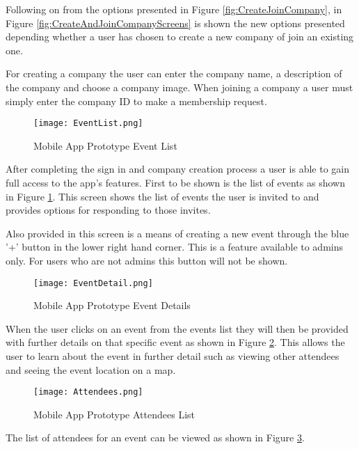 Following on from the options presented in Figure \ref{fig:CreateJoinCompany}, in Figure \ref{fig:CreateAndJoinCompanyScreens} is shown the new options presented depending whether a user has chosen to create a new company of join an existing one. 

For creating a company the user can enter the company name, a description of the company and choose a company image. When joining a company a user must simply enter the company ID to make a membership request.

\clearpage
\begin{figure}[ht]
  \centering
      \texttt{[image: EventList.png]}
  \caption[Mobile App Prototype Event List]{Mobile App Prototype Event List}
  \label{fig:EventList}
\end{figure}

After completing the sign in and company creation process a user is able to gain full access to the app's features. First to be shown is the list of events as shown in Figure \ref{fig:EventList}. This screen shows the list of events the user is invited to and provides options for responding to those invites.

Also provided in this screen is a means of creating a new event through the blue '+' button in the lower right hand corner. This is a feature available to admins only. For users who are not admins this button will not be shown.

\begin{figure}[ht]
  \centering
      \texttt{[image: EventDetail.png]}
  \caption[Mobile App Prototype Event Details]{Mobile App Prototype Event Details}
  \label{fig:EventDetail}
\end{figure}

When the user clicks on an event from the events list they will then be provided with further details on that specific event as shown in Figure \ref{fig:EventDetail}. This allows the user to learn about the event in further detail such as viewing other attendees and seeing the event location on a map.

\clearpage
\begin{figure}[ht]
  \centering
      \texttt{[image: Attendees.png]}
  \caption[Mobile App Prototype Attendees List]{Mobile App Prototype Attendees List}
  \label{fig:AttendeesList}
\end{figure}

The list of attendees for an event can be viewed as shown in Figure \ref{fig:AttendeesList}.

